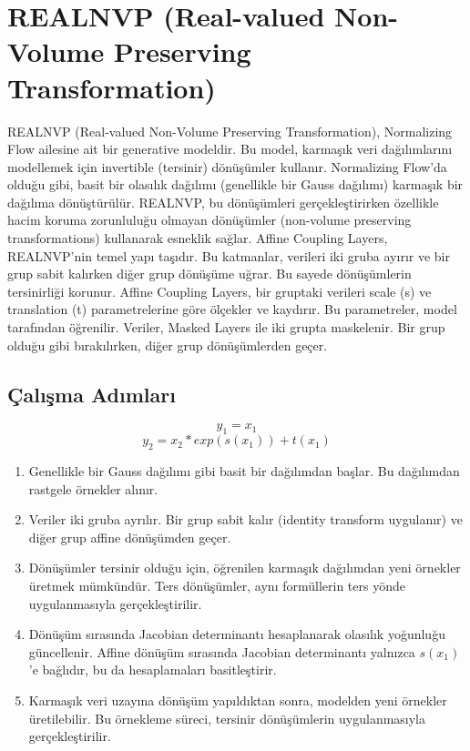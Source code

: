 \section{REALNVP (Real-valued Non-Volume Preserving Transformation)}

REALNVP (Real-valued Non-Volume Preserving Transformation), Normalizing Flow ailesine ait bir generative modeldir. Bu model, karmaşık veri dağılımlarını modellemek için invertible (tersinir) dönüşümler kullanır. Normalizing Flow'da olduğu gibi, basit bir olasılık dağılımı (genellikle bir Gauss dağılımı) karmaşık bir dağılıma dönüştürülür. REALNVP, bu dönüşümleri gerçekleştirirken özellikle hacim koruma zorunluluğu olmayan dönüşümler (non-volume preserving transformations) kullanarak esneklik sağlar. Affine Coupling Layers, REALNVP'nin temel yapı taşıdır. Bu katmanlar, verileri iki gruba ayırır ve bir grup sabit kalırken diğer grup dönüşüme uğrar. Bu sayede dönüşümlerin tersinirliği korunur. Affine Coupling Layers, bir gruptaki verileri scale (s) ve translation (t) parametrelerine göre ölçekler ve kaydırır. Bu parametreler, model tarafından öğrenilir. Veriler, Masked Layers ile iki grupta maskelenir. Bir grup olduğu gibi bırakılırken, diğer grup dönüşümlerden geçer.

\subsection{Çalışma Adımları}

\[ y_1 = x_1 \]
\[ y_2 = x_2 * exp(s(x_1)) + t(x_1) \]

\begin{enumerate}
    \item Genellikle bir Gauss dağılımı gibi basit bir dağılımdan başlar. Bu dağılımdan rastgele örnekler alınır.
    \item Veriler iki gruba ayrılır. Bir grup sabit kalır (identity transform uygulanır) ve diğer grup affine dönüşümden geçer.
    \item Dönüşümler tersinir olduğu için, öğrenilen karmaşık dağılımdan yeni örnekler üretmek mümkündür. Ters dönüşümler, aynı formüllerin ters yönde uygulanmasıyla gerçekleştirilir.
    \item Dönüşüm sırasında Jacobian determinantı hesaplanarak olasılık yoğunluğu güncellenir. Affine dönüşüm sırasında Jacobian determinantı yalnızca $s(x_1)$'e bağlıdır, bu da hesaplamaları basitleştirir.
    \item Karmaşık veri uzayına dönüşüm yapıldıktan sonra, modelden yeni örnekler üretilebilir. Bu örnekleme süreci, tersinir dönüşümlerin uygulanmasıyla gerçekleştirilir.
\end{enumerate}

